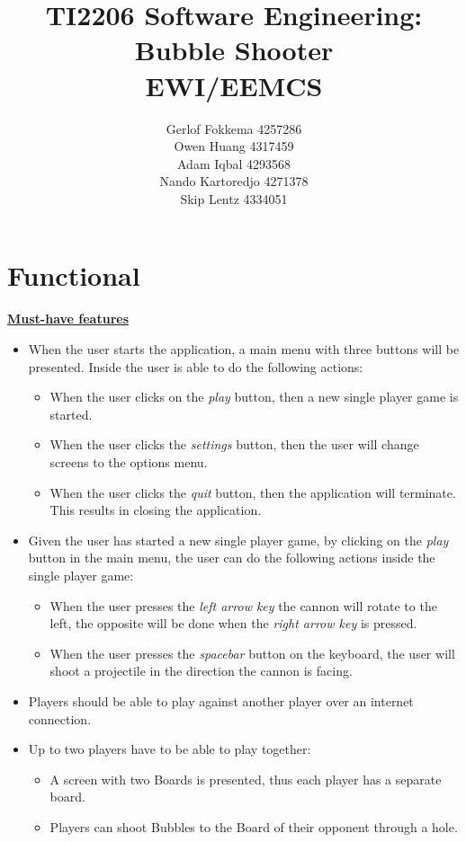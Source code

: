 \documentclass[a4paper,11pt]{article}
\title{TI2206 Software Engineering: Bubble Shooter \\ EWI/EEMCS}
\author{Gerlof Fokkema 4257286 \\
	Owen Huang 4317459 \\
	Adam Iqbal 4293568 \\
	Nando Kartoredjo 4271378 \\
	Skip Lentz 4334051 \\
}
\begin{document}
\maketitle

\thispagestyle{empty}
\newpage
\setcounter{page}{1}

\section*{Functional}
\textbf{\underline{Must-have features}}
\begin{itemize}
  \item When the user starts the application, a main menu with three buttons will be presented. Inside the user is able to do the following actions:
  \begin{itemize}
    \item When the user clicks on the \textit{play} button, then a new single player game is started.
    \item When the user clicks the \textit{settings} button, then the user will change screens to the options menu.
    \item When the user clicks the \textit{quit} button, then the application will terminate. This results in closing the application.
  \end{itemize}
  \item Given the user has started a new single player game, by clicking on the \textit{play} button in the main menu, the user can do the following actions inside the single player game:
  \begin{itemize}
    \item When the user presses the \textit{left arrow key} the cannon will rotate to the left, the opposite will be done when the \textit{right arrow key} is pressed.
    \item When the user presses the \textit{spacebar} button on the keyboard, the user will shoot a projectile in the direction the cannon is facing.
  \end{itemize}

  \item Players should be able to play against another player over an internet connection.
  \item Up to two players have to be able to play together:
  \begin{itemize}
    \item A screen with two Boards is presented, thus each player has a separate board.
    \item Players can shoot Bubbles to the Board of their opponent through a hole.
  \end{itemize}


\end{itemize}
\end{document}
